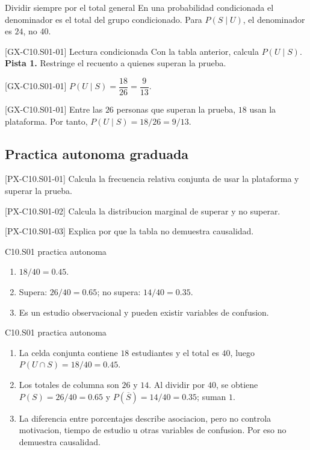 \begin{commonerror}{Dividir siempre por el total general}
En una probabilidad condicionada el denominador es el total del grupo condicionado. Para
\(P(S\mid U)\), el denominador es \(24\), no \(40\).
\end{commonerror}

\begin{guidedexercise}{[GX-C10.S01-01] Lectura condicionada}
Con la tabla anterior, calcula \(P(U\mid S)\).
\textbf{Pista 1.} Restringe el recuento a quienes superan la prueba.
\end{guidedexercise}
\begin{shortanswer}{[GX-C10.S01-01]} \(P(U\mid S)=\dfrac{18}{26}=\dfrac9{13}\). \end{shortanswer}
\begin{fullsolution}{[GX-C10.S01-01]}
Entre las \(26\) personas que superan la prueba, \(18\) usan la plataforma. Por tanto,
\(P(U\mid S)=18/26=9/13\).
\end{fullsolution}

\subsection*{Practica autonoma graduada}
\begin{exercise}{[PX-C10.S01-01] Calcula la frecuencia relativa conjunta de usar la plataforma y superar la prueba.}\end{exercise}
\begin{exercise}{[PX-C10.S01-02] Calcula la distribucion marginal de superar y no superar.}\end{exercise}
\begin{exercise}{[PX-C10.S01-03] Explica por que la tabla no demuestra causalidad.}\end{exercise}
\begin{shortanswer}{C10.S01 practica autonoma}
\begin{enumerate}
  \item \(18/40=0.45\).
  \item Supera: \(26/40=0.65\); no supera: \(14/40=0.35\).
  \item Es un estudio observacional y pueden existir variables de confusion.
\end{enumerate}
\end{shortanswer}
\begin{fullsolution}{C10.S01 practica autonoma}
\begin{enumerate}
  \item La celda conjunta contiene \(18\) estudiantes y el total es \(40\), luego
  \(P(U\cap S)=18/40=0.45\).
  \item Los totales de columna son \(26\) y \(14\). Al dividir por \(40\), se obtiene
  \(P(S)=26/40=0.65\) y \(P(\overline S)=14/40=0.35\); suman \(1\).
  \item La diferencia entre porcentajes describe asociacion, pero no controla motivacion,
  tiempo de estudio u otras variables de confusion. Por eso no demuestra causalidad.
\end{enumerate}
\end{fullsolution}


